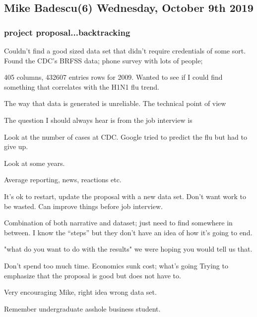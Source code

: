 \subsection{Mike Badescu(6) Wednesday, October 9th 2019}

\subsubsection{project proposal...backtracking}

Couldn't find a good sized data set that didn't require
credentials of some sort.
Found the CDC's BRFSS data; phone survey with
lots of people;

405 columns, 432607 entries rows for 2009.
Wanted to see if I could find something that
correlates with the H1N1 flu trend.

The way that data is generated
is unreliable. The technical point
of view

The question I should always hear is
from the job interview is

Look at the number of cases at CDC.
Google tried to predict the flu
but had to give up.

Look at some years.

Average reporting, news, reactions etc.

It's ok to restart, update the proposal
with a new data set.
Don't want work to be wasted. Can
improve things before job interview.

Combination of both narrative and dataset;
just need to find somewhere in between.
I know the ``steps'' but they don't have an idea of
how it's going to end.

"what do you want to do with the results"
we were hoping you would tell us that.

Don't spend too much time.
Economics sunk cost; what's going
Trying to emphasize that the proposal is
good but does not have to.

Very encouraging Mike, right idea wrong data
set.

Remember undergraduate asshole business student.

